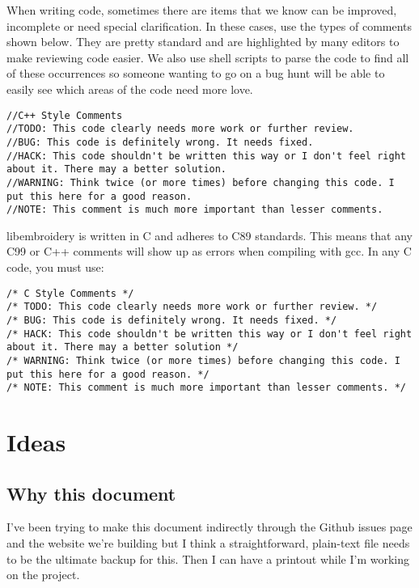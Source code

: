 When writing code, sometimes there are items that we know can be
improved, incomplete or need special clarification. In these cases, use
the types of comments shown below. They are pretty standard and are
highlighted by many editors to make reviewing code easier. We also use
shell scripts to parse the code to find all of these occurrences so
someone wanting to go on a bug hunt will be able to easily see which
areas of the code need more love.

\begin{verbatim}
//C++ Style Comments
//TODO: This code clearly needs more work or further review.
//BUG: This code is definitely wrong. It needs fixed.
//HACK: This code shouldn't be written this way or I don't feel right about it. There may a better solution.
//WARNING: Think twice (or more times) before changing this code. I put this here for a good reason.
//NOTE: This comment is much more important than lesser comments.
\end{verbatim}

libembroidery is written in C and adheres to C89 standards. This means
that any C99 or C++ comments will show up as errors when compiling with
gcc. In any C code, you must use:

\begin{verbatim}
/* C Style Comments */
/* TODO: This code clearly needs more work or further review. */
/* BUG: This code is definitely wrong. It needs fixed. */
/* HACK: This code shouldn't be written this way or I don't feel right about it. There may a better solution */
/* WARNING: Think twice (or more times) before changing this code. I put this here for a good reason. */
/* NOTE: This comment is much more important than lesser comments. */
\end{verbatim}

\hypertarget{ideas-1}{%
\section{Ideas}\label{ideas-1}}

\hypertarget{why-this-document-1}{%
\subsection{Why this document}\label{why-this-document-1}}

I've been trying to make this document indirectly through the Github
issues page and the website we're building but I think a
straightforward, plain-text file needs to be the ultimate backup for
this. Then I can have a printout while I'm working on the project.

